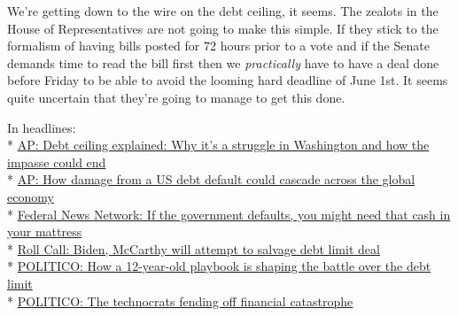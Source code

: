 We're getting down to the wire on the debt ceiling, it seems. The
zealots in the House of Representatives are not going to make this
simple. If they stick to the formalism of having bills posted for 72
hours prior to a vote and if the Senate demands time to read the bill
first then we \emph{practically} have to have a deal done before Friday
to be able to avoid the looming hard deadline of June 1st. It seems
quite uncertain that they're going to manage to get this done.

In headlines:\\
*
\href{https://apnews.com/article/debt-ceiling-biden-mccarthy-default-negotiations-cb0646c6301f1df97211896897df3723}{AP:
Debt ceiling explained: Why it's a struggle in Washington and how the
impasse could end}\\
*
\href{https://apnews.com/article/debt-limit-congress-world-economy-recession-biden-52df635e9b89f4b1677176fc8d59eff0}{AP:
How damage from a US debt default could cascade across the global
economy}\\
*
\href{https://federalnewsnetwork.com/pay-benefits/2023/05/if-the-government-defaults-you-might-need-that-cash-in-you-mattress/}{Federal
News Network: If the government defaults, you might need that cash in
your mattress}\\
*
\href{https://rollcall.com/2023/05/22/biden-mccarthy-will-attempt-to-salvage-debt-limit-deal/}{Roll
Call: Biden, McCarthy will attempt to salvage debt limit deal}\\
*
\href{https://www.politico.com/news/2023/05/22/debt-limit-obama-biden-2011-00097961}{POLITICO:
How a 12-year-old playbook is shaping the battle over the debt limit}\\
*
\href{https://www.politico.com/news/2023/05/22/treasury-janet-yellen-debt-limit-00098135}{POLITICO:
The technocrats fending off financial catastrophe}
